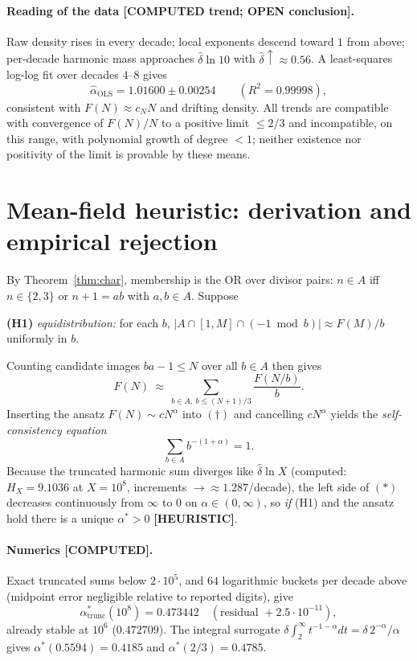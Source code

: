 \documentclass[11pt]{article}
\theoremstyle{definition}
\newcommand{\A}{A}
\newcommand{\F}{F}
\begin{document}
\paragraph{Reading of the data [COMPUTED trend; OPEN conclusion].}
Raw density rises in every decade; local exponents descend toward $1$ from
above; per-decade harmonic mass approaches $\hat\delta\ln10$ with
$\hat\delta\uparrow\approx0.56$. A least-squares log-log fit over decades
$4$--$8$ gives
\[
\hat\alpha_{\mathrm{OLS}}=1.01600\pm0.00254\qquad(R^2=0.99998),
\]
consistent with $\F(N)\approx c_N N$ and drifting density. All trends are
compatible with convergence of $\F(N)/N$ to a positive limit $\le 2/3$ and
incompatible, on this range, with polynomial growth of degree $<1$; neither
existence nor positivity of the limit is provable by these means.

\section{Mean-field heuristic: derivation and empirical rejection}\label{sec:heuristic}

By Theorem~\ref{thm:char}, membership is the OR over divisor pairs:
$n\in\A$ iff $n\in\{2,3\}$ or $n+1=ab$ with $a,b\in\A$. Suppose

\medskip
\noindent\textbf{(H1)} \emph{equidistribution:} for each $b$,
$|\A\cap[1,M]\cap(-1\bmod b)|\approx\F(M)/b$ uniformly in $b$.

\medskip
Counting candidate images $ba-1\le N$ over all $b\in\A$ then gives
\begin{equation}
\F(N)\ \approx\ \sum_{b\in\A,\ b\le (N+1)/3}\frac{\F(N/b)}{b}. \tag{$\dagger$}
\end{equation}
Inserting the ansatz $\F(N)\sim cN^{\alpha}$ into $(\dagger)$ and cancelling
$cN^{\alpha}$ yields the \emph{self-consistency equation}
\begin{equation}
\sum_{b\in\A} b^{-(1+\alpha)}=1. \tag{$\ast$}
\end{equation}
Because the truncated harmonic sum diverges like $\hat\delta\ln X$
(computed: $H_X=9.1036$ at $X=10^8$, increments $\to\approx1.287$/decade), the
left side of $(\ast)$ decreases continuously from $\infty$ to $0$ on
$\alpha\in(0,\infty)$, so \emph{if} (H1) and the ansatz hold there is a unique
$\alpha^\ast>0$ \textbf{[HEURISTIC]}.

\paragraph{Numerics [COMPUTED].} Exact truncated sums below $2\cdot10^5$, and
$64$ logarithmic buckets per decade above (midpoint error negligible relative
to reported digits), give
\[
\alpha^\ast_{\mathrm{trunc}}(10^8)=0.473442
\quad(\text{residual }+2.5\cdot10^{-11}),
\]
already stable at $10^6$ ($0.472709$). The integral surrogate
$\delta\int_2^\infty t^{-1-\alpha}dt=\delta\,2^{-\alpha}/\alpha$ gives
$\alpha^\ast(0.5594)=0.4185$ and $\alpha^\ast(2/3)=0.4785$.
\end{document}
